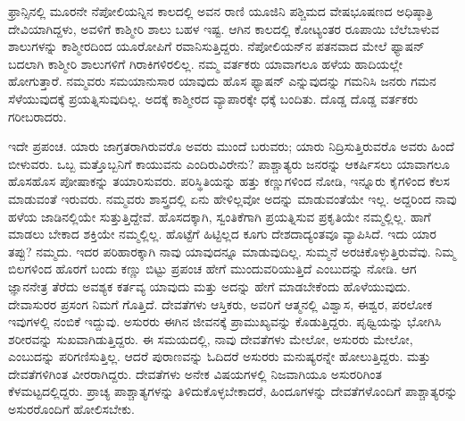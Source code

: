 ಫ್ರಾನ್ಸಿನಲ್ಲಿ ಮೂರನೇ ನೆಪೋಲಿಯನ್ನಿನ ಕಾಲದಲ್ಲಿ ಅವನ ರಾಣಿ ಯೂಜಿನಿ ಪಶ್ಚಿಮದ ವೇಷಭೂಷಣದ ಅಧಿಷ್ಠಾತ್ರಿ ದೇವಿಯಾಗಿದ್ದಳು, ಅವಳಿಗೆ ಕಾಶ್ಮೀರಿ ಶಾಲು ಬಹಳ ಇಷ್ಟ. ಆಗಿನ ಕಾಲದಲ್ಲಿ ಕೋಟ್ಯಂತರ ರೂಪಾಯಿ ಬೆಲೆಬಾಳುವ ಶಾಲುಗಳನ್ನು ಕಾಶ್ಮೀರದಿಂದ ಯೂರೋಪಿಗೆ ರವಾನಿಸುತ್ತಿದ್ದರು. ನೆಪೋಲಿಯನ್​ನ ಪತನ\break ವಾದ ಮೇಲೆ ಫ್ಯಾಷನ್​ ಬದಲಾಗಿ ಕಾಶ್ಮೀರಿ ಶಾಲುಗಳಿಗೆ ಗಿರಾಕಿಗಳಿರಲಿಲ್ಲ. ನಮ್ಮ ವರ್ತಕರು ಯಾವಾಗಲೂ ಹಳೆಯ ಹಾದಿಯಲ್ಲೇ ಹೋಗುತ್ತಾರೆ. ನಮ್ಮವರು ಸಮಯಾನುಸಾರ ಯಾವುದು ಹೊಸ ಫ್ಯಾಷನ್​ ಎನ್ನುವುದನ್ನು ಗಮನಿಸಿ ಜನರು ಗಮನ ಸೆಳೆಯುವುದಕ್ಕೆ ಪ್ರಯತ್ನಿಸುವುದಿಲ್ಲ. ಅದಕ್ಕೆ ಕಾಶ್ಮೀರದ ವ್ಯಾಪಾರಕ್ಕೇ ಧಕ್ಕೆ ಬಂದಿತು. ದೊಡ್ಡ ದೊಡ್ಡ ವರ್ತಕರು ಗರೀಬರಾದರು.

ಇದೇ ಪ್ರಪಂಚ. ಯಾರು ಜಾಗ್ರತರಾಗಿರುವರೊ ಅವರು ಮುಂದೆ ಬರುವರು; ಯಾರು ನಿದ್ರಿಸುತ್ತಿರುವರೊ ಅವರು ಹಿಂದೆ ಬೀಳುವರು. ಒಬ್ಬ ಮತ್ತೊಬ್ಬನಿಗೆ ಕಾಯುವನು ಎಂದಿರುವಿರೇನು? ಪಾಶ್ಚಾತ್ಯರು ಜನರನ್ನು ಆಕರ್ಷಿಸಲು ಯಾವಾಗಲೂ ಹೊಸಹೊಸ ಪೋಷಾಕನ್ನು ತಯಾರಿಸುವರು. ಪರಿಸ್ಥಿತಿಯನ್ನು ಹತ್ತು ಕಣ್ಣುಗಳಿಂದ ನೋಡಿ, ಇನ್ನೂರು ಕೈಗಳಿಂದ ಕೆಲಸ ಮಾಡುವಂತೆ ಇರುವರು. ನಮ್ಮವರು ಶಾಸ್ತ್ರದಲ್ಲಿ ಏನು ಹೇಳಿಲ್ಲವೋ ಅದನ್ನು ಮಾಡುವಂತೆಯೇ ಇಲ್ಲ. ಅದ್ದರಿಂದ ನಾವು ಹಳೆಯ ಜಾಡಿನಲ್ಲಿಯೇ ಸುತ್ತುತ್ತಿದ್ದೇವೆ. ಹೊಸದಕ್ಕಾಗಿ, ಸ್ವಂತಿಕೆಗಾಗಿ ಪ್ರಯತ್ನಿಸುವ ಪ್ರಕೃತಿಯೇ ನಮ್ಮಲ್ಲಿಲ್ಲ. ಹಾಗೆ ಮಾಡಲು ಬೇಕಾದ ಶಕ್ತಿಯೇ ನಮ್ಮಲ್ಲಿಲ್ಲ. ಹೊಟ್ಟೆಗೆ ಹಿಟ್ಟಿಲ್ಲದ ಕೂಗು ದೇಶದಾದ್ಯಂತವೂ ವ್ಯಾಪಿಸಿದೆ. ಇದು ಯಾರ ತಪ್ಪು? ನಮ್ಮದು. ಇದರ ಪರಿಹಾರಕ್ಕಾಗಿ ನಾವು ಯಾವುದನ್ನೂ ಮಾಡುವುದಿಲ್ಲ. ಸುಮ್ಮನೆ ಅರಚಿಕೊಳ್ಳುತ್ತಿರುವೆವು. ನಿಮ್ಮ ಬಿಲಗಳಿಂದ ಹೊರಗೆ ಬಂದು ಕಣ್ಣು ಬಿಟ್ಟು ಪ್ರಪಂಚ ಹೇಗೆ ಮುಂದುವರಿಯುತ್ತಿದೆ ಎಂಬುದನ್ನು ನೋಡಿ. ಆಗ ಜ್ಞಾನನೇತ್ರ ತೆರೆದು ಅವಶ್ಯಕ ಕರ್ತವ್ಯ ಯಾವುದು ಮತ್ತು ಅದನ್ನು ಹೇಗೆ ಮಾಡಬೇಕೆಂದು ಹೊಳೆಯುವುದು. ದೇವಾಸುರರ ಪ್ರಸಂಗ ನಿಮಗೆ ಗೊತ್ತಿದೆ. ದೇವತೆಗಳು ಆಸ್ತಿಕರು, ಅವರಿಗೆ ಆತ್ಮನಲ್ಲಿ ವಿಶ್ವಾಸ, ಈಶ್ವರ, ಪರಲೋಕ ಇವುಗಳಲ್ಲಿ ನಂಬಿಕೆ ಇದ್ದುವು. ಅಸುರರು ಈಗಿನ ಜೀವನಕ್ಕೆ ಪ್ರಾಮುಖ್ಯವನ್ನು ಕೊಡುತ್ತಿದ್ದರು. ಪೃಥ್ವಿಯನ್ನು ಭೋಗಿಸಿ ಶರೀರವನ್ನು ಸುಖವಾಗಿಡುತ್ತಿದ್ದರು. ಈ ಸಮಯದಲ್ಲಿ, ನಾವು ದೇವತೆಗಳು ಮೇಲೋ, ಅಸುರರು ಮೇಲೋ, ಎಂಬುದನ್ನು ಪರಿಗಣಿಸುತ್ತಿಲ್ಲ. ಆದರೆ ಪುರಾಣವನ್ನು ಓದಿದರೆ ಅಸುರರು ಮನುಷ್ಯರನ್ನೇ ಹೋಲುತ್ತಿದ್ದರು. ಮತ್ತು ದೇವತೆಗಳಿಗಿಂತ ವೀರರಾಗಿದ್ದರು. ದೇವತೆಗಳು ಅನೇಕ ವಿಷಯಗಳಲ್ಲಿ ನಿಜವಾಗಿಯೂ ಅಸುರರಿಗಿಂತ ಕೆಳಮಟ್ಟದಲ್ಲಿದ್ದರು. ಪ್ರಾಚ್ಯ ಪಾಶ್ಚಾತ್ಯಗಳನ್ನು ತಿಳಿದುಕೊಳ್ಳಬೇಕಾದರೆ, ಹಿಂದೂಗಳನ್ನು ದೇವತೆಗಳೊಂದಿಗೆ ಪಾಶ್ಚಾತ್ಯರನ್ನು ಅಸುರರೊಂದಿಗೆ ಹೋಲಿಸಬೇಕು.

